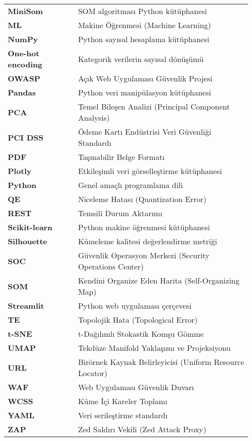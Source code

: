 \begin{spacing}{1.0}
\begin{longtable}{@{}p{} p{}@{}}
\textbf{MiniSom} & SOM algoritması Python kütüphanesi \\[1ex]
\textbf{ML}  &	Makine Öğrenmesi (Machine Learning) \\[1ex]
\textbf{NumPy} & Python sayısal hesaplama kütüphanesi \\[1ex]
\textbf{One-hot encoding} & Kategorik verilerin sayısal dönüşümü \\[1ex]
\textbf{OWASP}  &	Açık Web Uygulaması Güvenlik Projesi \\[1ex]
\textbf{Pandas} & Python veri manipülasyon kütüphanesi \\[1ex]
\textbf{PCA}  &	Temel Bileşen Analizi (Principal Component Analysis) \\[1ex]
\textbf{PCI DSS} & Ödeme Kartı Endüstrisi Veri Güvenliği Standardı \\[1ex]
\textbf{PDF}  &	Taşınabilir Belge Formatı \\[1ex]
\textbf{Plotly} & Etkileşimli veri görselleştirme kütüphanesi \\[1ex]
\textbf{Python} & Genel amaçlı programlama dili \\[1ex]
\textbf{QE} & Niceleme Hatası (Quantization Error) \\[1ex]
\textbf{REST}  &	Temsili Durum Aktarımı \\[1ex]
\textbf{Scikit-learn} & Python makine öğrenmesi kütüphanesi \\[1ex]
\textbf{Silhouette} & Kümeleme kalitesi değerlendirme metriği \\[1ex]
\textbf{SOC} & Güvenlik Operasyon Merkezi (Security Operations Center) \\[1ex]
\textbf{SOM}  &	Kendini Organize Eden Harita (Self-Organizing Map) \\[1ex]
\textbf{Streamlit} & Python web uygulaması çerçevesi \\[1ex]
\textbf{TE} & Topolojik Hata (Topological Error) \\[1ex]
\textbf{t-SNE}  &	t-Dağılımlı Stokastik Komşu Gömme \\[1ex]
\textbf{UMAP}  &	Tekdüze Manifold Yaklaşımı ve Projeksiyonu \\[1ex]
\textbf{URL} & Birörnek Kaynak Belirleyicisi (Uniform Resource Locator) \\[1ex]
\textbf{WAF}  &	Web Uygulaması Güvenlik Duvarı \\[1ex]
\textbf{WCSS}  &	Küme İçi Kareler Toplamı \\[1ex]
\textbf{YAML} & Veri serileştirme standardı \\[1ex]
\textbf{ZAP}  &	Zed Saldırı Vekili (Zed Attack Proxy) \\[2ex]

\end{longtable}
\end{spacing}
